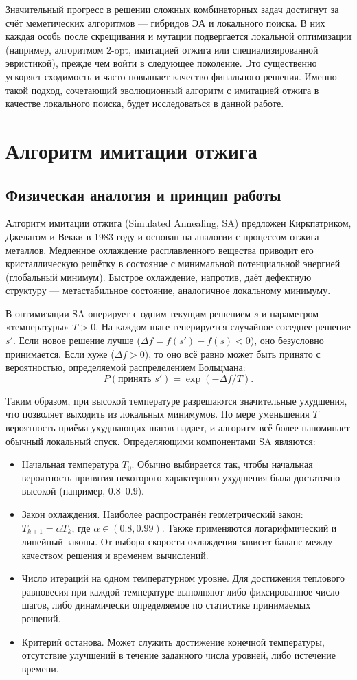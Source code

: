 \documentclass[732]{studrep}
\theoremstyle{nonumberplain}
\begin{document}
Значительный прогресс в решении сложных комбинаторных задач достигнут за счёт меметических алгоритмов — гибридов ЭА и локального поиска. В них каждая особь после скрещивания и мутации подвергается локальной оптимизации (например, алгоритмом 2-opt, имитацией отжига или специализированной эвристикой), прежде чем войти в следующее поколение. Это существенно ускоряет сходимость и часто повышает качество финального решения. Именно такой подход, сочетающий эволюционный алгоритм с имитацией отжига в качестве локального поиска, будет исследоваться в данной работе.

\section{Алгоритм имитации отжига}
\subsection{Физическая аналогия и принцип работы}

Алгоритм имитации отжига (Simulated Annealing, SA) предложен Киркпатриком, Джелатом и Векки в 1983 году и основан на аналогии с процессом отжига металлов. Медленное охлаждение расплавленного вещества приводит его кристаллическую решётку в состояние с минимальной потенциальной энергией (глобальный минимум). Быстрое охлаждение, напротив, даёт дефектную структуру — метастабильное состояние, аналогичное локальному минимуму.

В оптимизации SA оперирует с одним текущим решением $s$ и параметром «температуры» $T > 0$. На каждом шаге генерируется случайное соседнее решение $s'$. Если новое решение лучше ($\Delta f = f(s') - f(s) < 0$), оно безусловно принимается. Если хуже ($\Delta f > 0$), то оно всё равно может быть принято с вероятностью, определяемой распределением Больцмана:
\[
P(\text{принять } s') = \exp(-\Delta f / T).
\]

Таким образом, при высокой температуре разрешаются значительные ухудшения, что позволяет выходить из локальных минимумов. По мере уменьшения $T$ вероятность приёма ухудшающих шагов падает, и алгоритм всё более напоминает обычный локальный спуск.
Определяющими компонентами SA являются:
\begin{itemize}
\item Начальная температура $T_0$. Обычно выбирается так, чтобы начальная вероятность принятия некоторого характерного ухудшения была достаточно высокой (например, $0.8$–$0.9$).
\item Закон охлаждения. Наиболее распространён геометрический закон: $T_{k+1} = \alpha T_k$, где $\alpha \in (0.8, 0.99)$. Также применяются логарифмический и линейный законы. От выбора скорости охлаждения зависит баланс между качеством решения и временем вычислений.
\item Число итераций на одном температурном уровне. Для достижения теплового равновесия при каждой температуре выполняют либо фиксированное число шагов, либо динамически определяемое по статистике принимаемых решений.
\item Критерий останова. Может служить достижение конечной температуры, отсутствие улучшений в течение заданного числа уровней, либо истечение времени.
\end{itemize}
\end{document}
